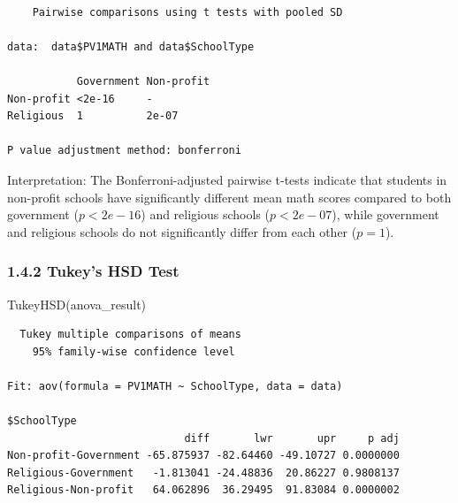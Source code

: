 \documentclass[
  letterpaper,
  DIV=11,
  numbers=noendperiod]{scrreprt}
\newenvironment{Shaded}{\begin{snugshade}}{\end{snugshade}}
\newcommand{\AttributeTok}[1]{\textcolor[rgb]{0.40,0.45,0.13}{#1}}
\newcommand{\FunctionTok}[1]{\textcolor[rgb]{0.28,0.35,0.67}{#1}}
\newcommand{\NormalTok}[1]{\textcolor[rgb]{0.00,0.23,0.31}{#1}}
\newcommand{\SpecialCharTok}[1]{\textcolor[rgb]{0.37,0.37,0.37}{#1}}
\newcommand{\StringTok}[1]{\textcolor[rgb]{0.13,0.47,0.30}{#1}}
\begin{document}
\begin{Shaded}
\end{Shaded}

\begin{verbatim}

    Pairwise comparisons using t tests with pooled SD 

data:  data$PV1MATH and data$SchoolType 

           Government Non-profit
Non-profit <2e-16     -         
Religious  1          2e-07     

P value adjustment method: bonferroni 
\end{verbatim}

Interpretation: The Bonferroni-adjusted pairwise t-tests indicate that
students in non-profit schools have significantly different mean math
scores compared to both government (\(p  < 2e-16\)) and religious
schools (\(p  < 2e-07\)), while government and religious schools do not
significantly differ from each other (\(p = 1\)).

\subsubsection*{1.4.2 Tukey's HSD Test}\label{tukeys-hsd-test}

\begin{Shaded}
\begin{Highlighting}[]
\FunctionTok{TukeyHSD}\NormalTok{(anova\_result) }
\end{Highlighting}
\end{Shaded}

\begin{verbatim}
  Tukey multiple comparisons of means
    95% family-wise confidence level

Fit: aov(formula = PV1MATH ~ SchoolType, data = data)

$SchoolType
                            diff       lwr       upr     p adj
Non-profit-Government -65.875937 -82.64460 -49.10727 0.0000000
Religious-Government   -1.813041 -24.48836  20.86227 0.9808137
Religious-Non-profit   64.062896  36.29495  91.83084 0.0000002
\end{verbatim}
\end{document}
